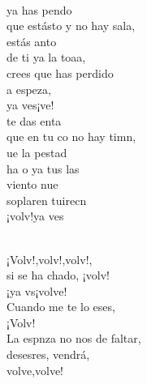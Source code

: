 \documentclass[12pt]{article}
\begin{document}
\begin{multicols*}{2}
\begin{cancion}%
	  \\
	ya has pendo\\
	que estásto y no hay sala,\\
	estás anto \\
	de ti ya la toaa,\\
	crees que  has perdido\\
	a  espeza,\\
	ya ves¡ve! \\
\jump
	te das enta\\
	que en tu co no hay timn,\\
	ue la pestad \\
	ha o ya tus las\\
	viento nue \\
	soplaren tuirecn \\
	¡volv!ya ves\\\jump\\
	\begin{chorus}%
	¡Volv!,volv!,volv!,     \\
	si se ha chado, ¡volv!\\
	¡ya vs¡volve!\\
	Cuando me te lo eses,\\
	¡Volv!\\
\jump
	La espnza no nos  de faltar,\\
	desesres, vendrá,\\
	volve,volve!\\

\end{chorus}
\end{cancion}
\end{multicols*}
\end{document}
